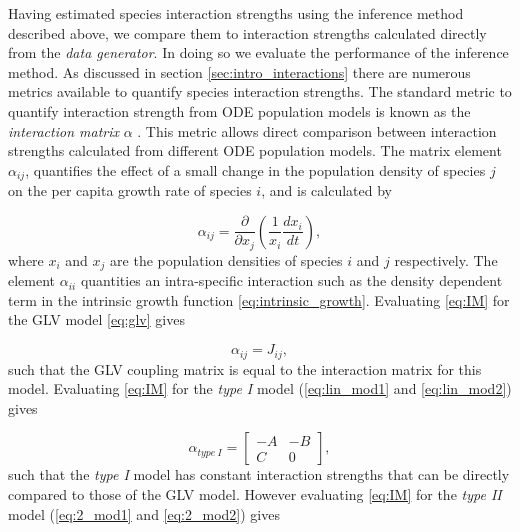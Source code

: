 Having estimated species interaction strengths using the inference method described above, we compare them to interaction strengths calculated directly from the \emph{data generator}. In doing so we evaluate the performance of the inference method. As discussed in section \ref{sec:intro_interactions} there are numerous metrics available to quantify species interaction strengths. The standard metric to quantify interaction strength from ODE population models is known as the \emph{interaction matrix} $\alpha $ \cite{wootton2005measurement}. This metric allows direct comparison between interaction strengths calculated from different ODE population models. The matrix element $\alpha_{ij}$, quantifies the effect of a small change in the population density of species $j$ on the per capita growth rate of species $i$, and is calculated by

\begin{equation}
\alpha_{ij} = \frac{\partial}{\partial x_{j}}\left(\frac{1}{x_{i}} \frac{dx_i}{dt} \right),
\label{eq:IM}
\end{equation}
%
where $x_i$ and $x_j$ are the population densities of species $i$ and $j$ respectively.  The element $\alpha_{ii}$ quantities an intra-specific interaction such as the density dependent term in the intrinsic growth function \eqref{eq:intrinsic_growth}. Evaluating \eqref{eq:IM} for the GLV model \eqref{eq:glv} gives

\begin{equation}
\alpha_{ij} = J_{ij},
\label{eq:alpha_glv}
\end{equation}
% 
such that the GLV coupling matrix is equal to the interaction matrix for this model. Evaluating \eqref{eq:IM} for the \emph{type I} model (\ref{eq:lin_mod1} and \ref{eq:lin_mod2}) gives

\begin{equation}
\alpha_{type\ I} = 
\begin{bmatrix}
-A & -B \\ C & 0
\end{bmatrix}  	,
\end{equation}
%
such that the \emph{type I} model has constant interaction strengths that can be directly compared to those of the GLV model. However evaluating \eqref{eq:IM} for the \emph{type II} model (\ref{eq:2_mod1} and \ref{eq:2_mod2}) gives

